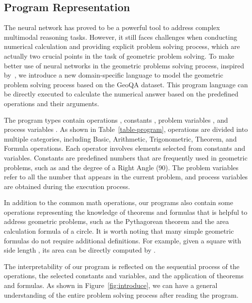 \documentclass[11pt,a4paper]{article}
\begin{document}
\subsection{Program Representation}
The neural network has proved to be a powerful tool to address complex multimodal reasoning tasks. However, it still faces challenges when conducting numerical calculation and providing explicit problem solving process, which are actually two crucial points in the task of geometric problem solving. To make better use of neural networks in the geometric problems solving process, inspired by~\citet{amini2019mathqa}, we introduce a new domain-specific language to model the geometric problem solving process based on the GeoQA dataset. This program language can be directly executed to calculate the numerical answer based on the predefined operations and their arguments.

The program types contain operations , constants , problem variables , and process variables . As shown in Table~\ref{table-program}, operations are divided into multiple categories, including Basic, Arithmetic, Trigonometric, Theorem, and Formula operations. Each operator involves  elements selected from constants and variables. Constants are predefined numbers that are frequently used in geometric problems, such as  and the degree of a Right Angle (90). The problem variables refer to all the number that appears in the current problem, and process variables are obtained during the execution process.

In addition to the common math operations, our programs also contain some operations representing the knowledge of theorems and formulas that is helpful to address geometric problems, such as the Pythagorean theorem and the area calculation formula of a circle. It is worth noting that many simple geometric formulas do not require additional definitions. For example, given a square with side length , its area can be directly computed by . 

The interpretability of our program is reflected on the sequential process of the operations, the selected constants and variables, and the application of theorems and formulas. As shown in Figure~\ref{fig:introduce}, we can have a general understanding of the entire problem solving process after reading the program.
\end{document}
